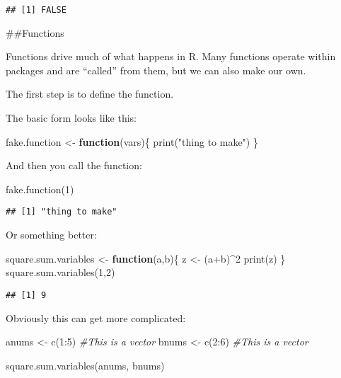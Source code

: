 \documentclass[
]{article}
\newenvironment{Shaded}{\begin{snugshade}}{\end{snugshade}}
\newcommand{\CommentTok}[1]{\textcolor[rgb]{0.56,0.35,0.01}{\textit{#1}}}
\newcommand{\ControlFlowTok}[1]{\textcolor[rgb]{0.13,0.29,0.53}{\textbf{#1}}}
\newcommand{\DecValTok}[1]{\textcolor[rgb]{0.00,0.00,0.81}{#1}}
\newcommand{\FunctionTok}[1]{\textcolor[rgb]{0.00,0.00,0.00}{#1}}
\newcommand{\NormalTok}[1]{#1}
\newcommand{\OtherTok}[1]{\textcolor[rgb]{0.56,0.35,0.01}{#1}}
\newcommand{\SpecialCharTok}[1]{\textcolor[rgb]{0.00,0.00,0.00}{#1}}
\newcommand{\StringTok}[1]{\textcolor[rgb]{0.31,0.60,0.02}{#1}}
\begin{document}
\begin{verbatim}
## [1] FALSE
\end{verbatim}

\#\#Functions

Functions drive much of what happens in R. Many functions operate within
packages and are ``called'' from them, but we can also make our own.

The first step is to define the function.

The basic form looks like this:

\begin{Shaded}
\begin{Highlighting}[]
\NormalTok{fake.function }\OtherTok{\textless{}{-}} \ControlFlowTok{function}\NormalTok{(vars)\{}
    \FunctionTok{print}\NormalTok{(}\StringTok{"thing to make"}\NormalTok{)}
\NormalTok{\} }
\end{Highlighting}
\end{Shaded}

And then you call the function:

\begin{Shaded}
\begin{Highlighting}[]
\FunctionTok{fake.function}\NormalTok{(}\DecValTok{1}\NormalTok{)}
\end{Highlighting}
\end{Shaded}

\begin{verbatim}
## [1] "thing to make"
\end{verbatim}

Or something better:

\begin{Shaded}
\begin{Highlighting}[]
\NormalTok{square.sum.variables }\OtherTok{\textless{}{-}} \ControlFlowTok{function}\NormalTok{(a,b)\{}
\NormalTok{  z }\OtherTok{\textless{}{-}}\NormalTok{ (a}\SpecialCharTok{+}\NormalTok{b)}\SpecialCharTok{\^{}}\DecValTok{2}
  \FunctionTok{print}\NormalTok{(z)}
\NormalTok{\} }
\FunctionTok{square.sum.variables}\NormalTok{(}\DecValTok{1}\NormalTok{,}\DecValTok{2}\NormalTok{)}
\end{Highlighting}
\end{Shaded}

\begin{verbatim}
## [1] 9
\end{verbatim}

Obviously this can get more complicated:

\begin{Shaded}
\begin{Highlighting}[]
\NormalTok{anums }\OtherTok{\textless{}{-}} \FunctionTok{c}\NormalTok{(}\DecValTok{1}\SpecialCharTok{:}\DecValTok{5}\NormalTok{) }\CommentTok{\#This is a vector}
\NormalTok{bnums }\OtherTok{\textless{}{-}} \FunctionTok{c}\NormalTok{(}\DecValTok{2}\SpecialCharTok{:}\DecValTok{6}\NormalTok{) }\CommentTok{\#This is a vector}

\FunctionTok{square.sum.variables}\NormalTok{(anums, bnums)}
\end{Highlighting}
\end{Shaded}
\end{document}
